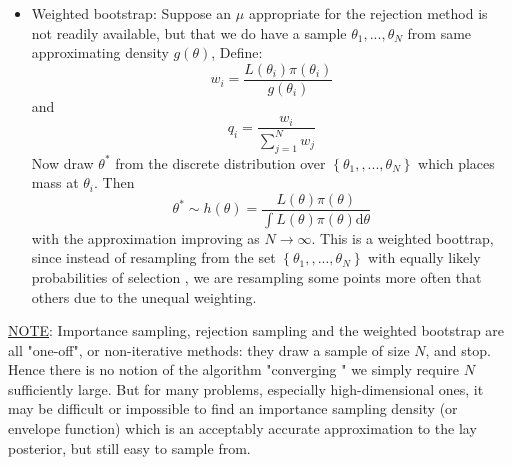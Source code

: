 \documentclass[lecture,12pt,]{pcms-l}
\numberwithin{section}{chapter}
\numberwithin{equation}{chapter}
\theoremstyle{plain}
\theoremstyle{definition}
\newtheorem{example}{Example}[section]
\theoremstyle{definition}
\begin{document}
\begin{enumerate}
\begin{itemize}
\begin{example}
\end{example}
The rejection method proceeds as follows:
\begin{enumerate}
\item Generate $\theta_j \sim g(\theta)$
\item Generate $U \sim Uniform(0,1)$
\item If $\mu u g(\theta_i) < L(\theta_j)\pi(\theta_j)$, accept $\theta_j$, otherwise reject $\theta_j$
\item Return to step $(i)$ and repeat until the desired sample $\left \{ \theta_j, j=1,...,N \right \}$ is obtained. The members of this sample will then be random samples from $h(\theta)$. 

Like an importance sampling density, the envelope density $g$ should be similar to the posterior in general appearance, but with heavier tails and sharper infinite peaks, in order to assure that there are sufficiently many rejection candidates available across its entire domain. Also $\mu g$ is actually an "envelope" for the unnormalized posterior $L \pi$.
\end{enumerate}
\item Weighted bootstrap: Suppose an $\mu$ appropriate for the rejection method is not readily available, but that we do have a sample $\theta_1,...,\theta_N$ from same approximating density $g(\theta)$, Define:
\begin{equation}
w_i=\frac{L(\theta_i)\pi(\theta_i)}{g(\theta_i)}
\end{equation}
and 
\begin{equation}
q_i=\frac{w_i}{\sum_{j=1}^{N}w_j}
\end{equation}
Now draw $\theta^*$ from the discrete distribution over $\left \{ \theta_1,,...,\theta_N \right \}$ which places mass at $\theta_i$. Then 
\begin{equation}
\theta^* \sim h(\theta)= \frac{L(\theta)\pi(\theta)}{\int L(\theta)\pi(\theta) \mathrm{d} \theta}
\end{equation}
with the approximation improving as $N \rightarrow \infty$. This is a weighted boottrap, since instead of resampling from the set $\left \{ \theta_1,,...,\theta_N \right \}$ with equally likely probabilities of selection , we are resampling some points more often that others due to the unequal weighting.
\end{itemize}
\end{enumerate}
\underline{NOTE}: Importance sampling, rejection sampling and the weighted bootstrap are all "one-off", or non-iterative methods: they draw a sample of size $N$, and stop. Hence there is no notion of the algorithm "converging " we simply require $N$ sufficiently large. But for many problems, especially high-dimensional ones, it may be difficult or impossible to find an importance sampling density (or envelope function) which is an acceptably accurate approximation to the lay posterior, but still easy to sample from.
\end{document}
